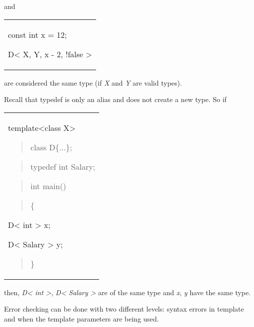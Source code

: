 \documentclass[
]{article}
\begin{document}
and

\begin{longtable}[]{@{}
  >{\raggedright\arraybackslash}p{}@{}}
\toprule\noalign{}
 \\
\midrule\noalign{}
\endhead
\bottomrule\noalign{}
\endlastfoot
const int x = 12;

D\textless{} X, Y, x - 2, !false \textgreater{} \\
\end{longtable}

are considered the same type (if \emph{X} and \emph{Y} are valid types).

Recall that typedef is only an alias and does not create a new type. So
if

\begin{longtable}[]{@{}
  >{\raggedright\arraybackslash}p{}@{}}
\toprule\noalign{}
 \\
\midrule\noalign{}
\endhead
\bottomrule\noalign{}
\endlastfoot
template\textless class X\textgreater{}

\begin{quote}
class D\{...\};
\end{quote}

\begin{quote}
typedef int Salary;
\end{quote}

\begin{quote}
\end{quote}

\begin{quote}
int main()
\end{quote}

\begin{quote}
\{
\end{quote}

D\textless{} int \textgreater{} x;

D\textless{} Salary \textgreater{} y;

\begin{quote}
\}
\end{quote} \\
\end{longtable}

then, \emph{D\textless{} int \textgreater{}}, \emph{D\textless{} Salary
\textgreater{}} are of the same type and \emph{x}, \emph{y} have the
same type.

Error checking can be done with two different levels: syntax errors in
template and when the template parameters are being used.
\end{document}
